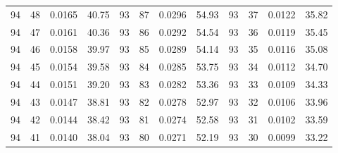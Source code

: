 \begin{tabular}{llll|llll|llll}
94 & 48 & 0.0165 & 40.75 & 93 & 87 & 0.0296 & 54.93 & 93 & 37 & 0.0122 & 35.82\\
94 & 47 & 0.0161 & 40.36 & 93 & 86 & 0.0292 & 54.54 & 93 & 36 & 0.0119 & 35.45\\
94 & 46 & 0.0158 & 39.97 & 93 & 85 & 0.0289 & 54.14 & 93 & 35 & 0.0116 & 35.08\\
94 & 45 & 0.0154 & 39.58 & 93 & 84 & 0.0285 & 53.75 & 93 & 34 & 0.0112 & 34.70\\
94 & 44 & 0.0151 & 39.20 & 93 & 83 & 0.0282 & 53.36 & 93 & 33 & 0.0109 & 34.33\\
94 & 43 & 0.0147 & 38.81 & 93 & 82 & 0.0278 & 52.97 & 93 & 32 & 0.0106 & 33.96\\
94 & 42 & 0.0144 & 38.42 & 93 & 81 & 0.0274 & 52.58 & 93 & 31 & 0.0102 & 33.59\\
94 & 41 & 0.0140 & 38.04 & 93 & 80 & 0.0271 & 52.19 & 93 & 30 & 0.0099 & 33.22\\
\bottomrule
\end{tabular}
\newpage
